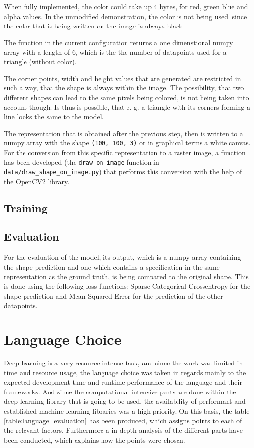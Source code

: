 \documentclass[12pt, a4paper, titlepage]{report}
\begin{document}
When fully implemented, the color could take up 4 bytes, for red, green blue and alpha values. In the unmodified demonstration, the color is not being used, since the color that is being written on the image is always black.

The function in the current configuration returns a one dimenstional numpy array with a length of 6, which is the the number of datapoints used for a triangle (without color).


The corner points, width and height values that are generated are restricted in such a way, that the shape is always within the image. The possibility, that two different shapes can lead to the same pixels being colored, is not being taken into account though. Is thus is possible, that e. g. a triangle with its corners forming a line looks the same to the model.


The representation that is obtained after the previous step, then is written to a numpy array with the shape \lstinline{(100, 100, 3)} or in graphical terms a white canvas. For the conversion from this specific representation to a raster image, a function has been developed (the \lstinline{draw_on_image} function in \lstinline{data/draw_shape_on_image.py}) that performs this conversion with the help of the OpenCV2 library.

\subsection{Training}
\subsection{Evaluation}

For the evaluation of the model, its output, which is a numpy array containing the shape prediction and one which contains a specification in the same representation as the ground truth, is being compared to the original shape. This is done using the following loss functions: Sparse Categorical Crossentropy for the shape prediction and Mean Squared Error for the prediction of the other datapoints.


\section{Language Choice}  %

Deep learning is a very resource intense task, and since the work was limited in time and resource usage, the language choice was taken in regards mainly to the expected development time and runtime performance of the language and their frameworks. And since the computational intensive parts are done within the deep learning library that is going to be used, the availability of performant and established machine learning libraries was a high priority. On this basis, the table \ref{table:language_evaluation} has been produced, which assigns points to each of the relevant factors. Furthermore a in-depth analysis of the different parts have been conducted, which explains how the points were chosen.
\end{document}
